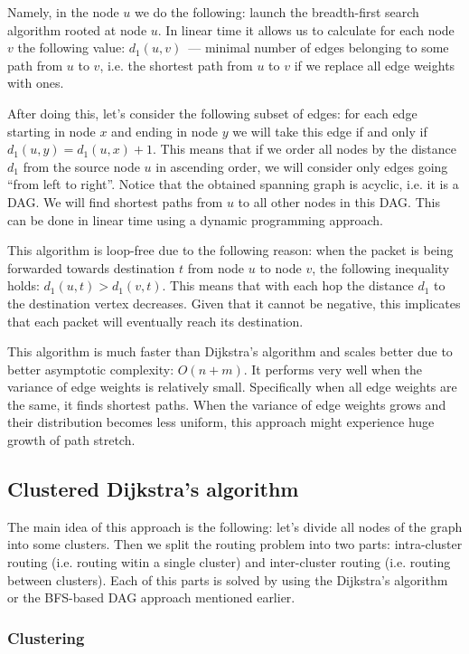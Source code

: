 Namely, in the node $u$ we do the following: launch the breadth-first search algorithm rooted at node $u$. In linear time it allows us to calculate for each node $v$ the following value: $d_1(u, v)$~--- minimal number of edges belonging to some path from $u$ to $v$, i.e. the shortest path from $u$ to $v$ if we replace all edge weights with ones.

After doing this, let's consider the following subset of edges: for each edge starting in node $x$ and ending in node $y$ we will take this edge if and only if $d_1(u, y) = d_1(u, x) + 1$. This means that if we order all nodes by the distance $d_1$ from the source node $u$ in ascending order, we will consider only edges going ``from left to right''. Notice that the obtained spanning graph is acyclic, i.e. it is a DAG. We will find shortest paths from $u$ to all other nodes in this DAG. This can be done in linear time using a dynamic programming approach.

This algorithm is loop-free due to the following reason: when the packet is being forwarded towards destination $t$ from node $u$ to node $v$, the following inequality holds: $d_1(u, t) > d_1(v, t)$. This means that with each hop the distance $d_1$ to the destination vertex decreases. Given that it cannot be negative, this implicates that each packet will eventually reach its destination.

This algorithm is much faster than Dijkstra's algorithm and scales better due to better asymptotic complexity: $O(n + m)$. It performs very well when the variance of edge weights is relatively small. Specifically when all edge weights are the same, it finds shortest paths. When the variance of edge weights grows and their distribution becomes less uniform, this approach might experience huge growth of path stretch.

\subsection{Clustered Dijkstra's algorithm}

The main idea of this approach is the following: let's divide all nodes of the graph into some clusters. Then we split the routing problem into two parts: intra-cluster routing (i.e. routing witin a single cluster) and inter-cluster routing (i.e. routing between clusters). Each of this parts is solved by using the Dijkstra's algorithm or the BFS-based DAG approach mentioned earlier.

\subsubsection{Clustering}

